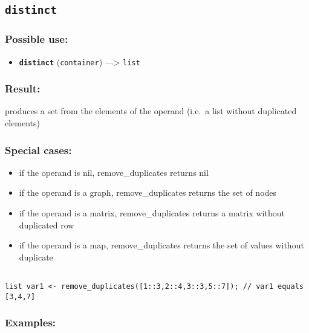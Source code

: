 \documentclass[]{book}
\providecommand{\tightlist}{%
  \setlength{\itemsep}{0pt}\setlength{\parskip}{0pt}}
\theoremstyle{definition}
\theoremstyle{definition}
\theoremstyle{definition}
\theoremstyle{remark}
\begin{document}
\subsection{\texorpdfstring{\texttt{distinct}}{distinct}}\label{distinct}

\subsubsection{Possible use:}\label{possible-use-137}

\begin{itemize}
\tightlist
\item
  \textbf{\texttt{distinct}} (\texttt{container}) ---\textgreater{}
  \texttt{list}
\end{itemize}

\subsubsection{Result:}\label{result-133}

produces a set from the elements of the operand (i.e.~a list without
duplicated elements)

\subsubsection{Special cases:}\label{special-cases-51}

\begin{itemize}
\tightlist
\item
  if the operand is nil, remove\_duplicates returns nil\\
\item
  if the operand is a graph, remove\_duplicates returns the set of
  nodes\\
\item
  if the operand is a matrix, remove\_duplicates returns a matrix
  without duplicated row\\
\item
  if the operand is a map, remove\_duplicates returns the set of values
  without duplicate
\end{itemize}

\begin{verbatim}
 
list var1 <- remove_duplicates([1::3,2::4,3::3,5::7]); // var1 equals [3,4,7]
\end{verbatim}

\subsubsection{Examples:}\label{examples-104}
\end{document}
